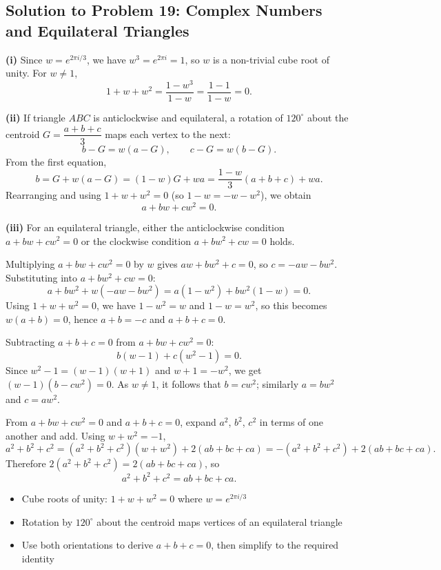 \subsection{Solution to Problem 19: Complex Numbers and Equilateral Triangles}

\begin{solution}
\textbf{(i)} Since $w = e^{2\pi i/3}$, we have $w^3 = e^{2\pi i} = 1$, so $w$ is a non-trivial cube root of unity. For $w \ne 1$,
\[
1 + w + w^2 = \frac{1-w^3}{1-w} = \frac{1-1}{1-w} = 0.
\]

\textbf{(ii)} If triangle $ABC$ is anticlockwise and equilateral, a rotation of $120^\circ$ about the centroid $G = \dfrac{a+b+c}{3}$ maps each vertex to the next:
\[
b - G = w(a-G), \qquad c - G = w(b-G).
\]
From the first equation,
\[
b = G + w(a-G) = (1-w)G + wa = \frac{1-w}{3}(a+b+c) + wa.
\]
Rearranging and using $1+w+w^2=0$ (so $1-w = -w-w^2$), we obtain
\[
a + bw + cw^2 = 0.
\]

\textbf{(iii)} For an equilateral triangle, either the anticlockwise condition $a+bw+cw^2=0$ or the clockwise condition $a+bw^2+cw=0$ holds.

Multiplying $a+bw+cw^2=0$ by $w$ gives $aw+bw^2+c=0$, so $c = -aw-bw^2$. Substituting into $a+bw^2+cw=0$:
\[
a + bw^2 + w(-aw-bw^2) = a(1-w^2) + bw^2(1-w) = 0.
\]
Using $1+w+w^2=0$, we have $1-w^2=w$ and $1-w=w^2$, so this becomes $w(a+b)=0$, hence $a+b=-c$ and $a+b+c=0$.

Subtracting $a+b+c=0$ from $a+bw+cw^2=0$:
\[
b(w-1)+c(w^2-1)=0.
\]
Since $w^2-1=(w-1)(w+1)$ and $w+1=-w^2$, we get $(w-1)(b-cw^2)=0$. As $w\ne 1$, it follows that $b=cw^2$; similarly $a=bw^2$ and $c=aw^2$.

From $a+bw+cw^2=0$ and $a+b+c=0$, expand $a^2$, $b^2$, $c^2$ in terms of one another and add. Using $w+w^2=-1$,
\[
a^2+b^2+c^2 = (a^2+b^2+c^2)(w+w^2) + 2(ab+bc+ca)
= -(a^2+b^2+c^2) + 2(ab+bc+ca).
\]
Therefore $2(a^2+b^2+c^2)=2(ab+bc+ca)$, so
\[
a^2+b^2+c^2 = ab+bc+ca.
\]
\end{solution}

\begin{takeaways}
\begin{itemize}
    \item Cube roots of unity: $1+w+w^2=0$ where $w=e^{2\pi i/3}$
    \item Rotation by $120^\circ$ about the centroid maps vertices of an equilateral triangle
    \item Use both orientations to derive $a+b+c=0$, then simplify to the required identity
\end{itemize}
\end{takeaways}
